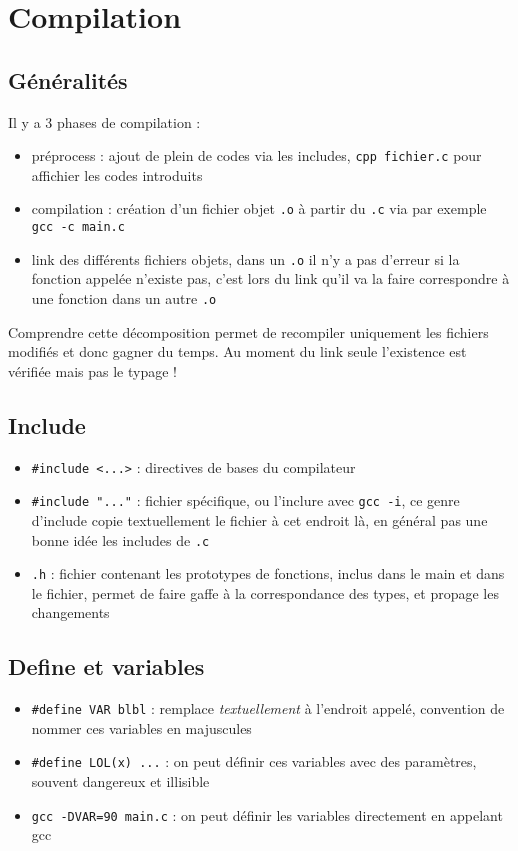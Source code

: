 \newpage
\section{Compilation}

\subsection{Généralités}
\ni
Il y a 3 phases de compilation :
\begin{itemize}
    \item préprocess : ajout de plein de codes via les includes, \verb|cpp fichier.c| pour affichier les codes introduits
    \item compilation : création d'un fichier objet \verb|.o| à partir du \verb|.c| via par exemple \verb|gcc -c main.c|
    \item link des différents fichiers objets, dans un \verb|.o| il n'y a pas d'erreur si la fonction appelée n'existe pas, c'est lors du link qu'il va la faire correspondre à une fonction dans un autre \verb|.o|
\end{itemize}
Comprendre cette décomposition permet de recompiler uniquement les fichiers modifiés et donc gagner du temps. Au moment du link seule l'existence est vérifiée mais pas le typage !

\subsection{Include}
\begin{itemize}
    \item \verb|#include <...>| : directives de bases du compilateur
    \item \verb|#include "..."| : fichier spécifique, ou l'inclure avec \verb|gcc -i|, ce genre d'include copie textuellement le fichier à cet endroit là, en général pas une bonne idée les includes de \verb|.c|
    \item \verb|.h| : fichier contenant les prototypes de fonctions, inclus dans le main et dans le fichier, permet de faire gaffe à la correspondance des types, et propage les changements
\end{itemize}

\subsection{Define et variables}
\begin{itemize}
    \item \verb|#define VAR blbl| : remplace \emph{textuellement} à l'endroit appelé, convention de nommer ces variables en majuscules
    \item \verb|#define LOL(x) ...| : on peut définir ces variables avec des paramètres, souvent dangereux et illisible
    \item \verb|gcc -DVAR=90 main.c| : on peut définir les variables directement en appelant gcc
\end{itemize}

